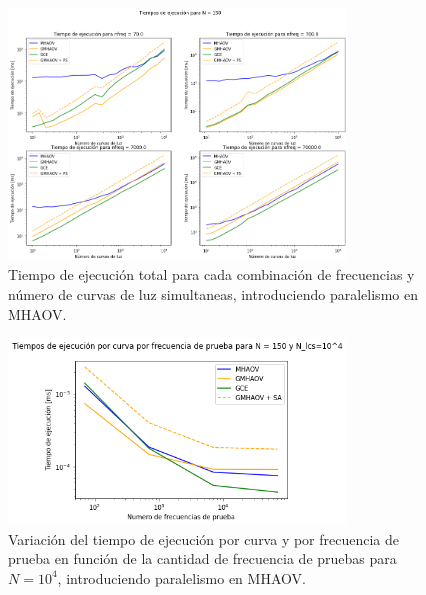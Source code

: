 \begin{figure}[H]
    \centering
    \includegraphics[width=0.8\textwidth]{figs/benchmarks-total-8c.png}
    \caption{Tiempo de ejecución total para cada combinación de frecuencias y número de curvas de luz simultaneas, introduciendo paralelismo en MHAOV.}
    \label{fig:benchmarks-8c}
\end{figure}

\begin{figure}[H]
    \centering
    \includegraphics[width=0.8\textwidth]{figs/benchmarks-frequency-8c.png}
    \caption{Variación del tiempo de ejecución por curva y por frecuencia de prueba en función de la cantidad de frecuencia de pruebas para $N=10^{4}$, introduciendo paralelismo en MHAOV.}
    \label{fig:benchmark-frecuencias-prueba-8c}
\end{figure}





